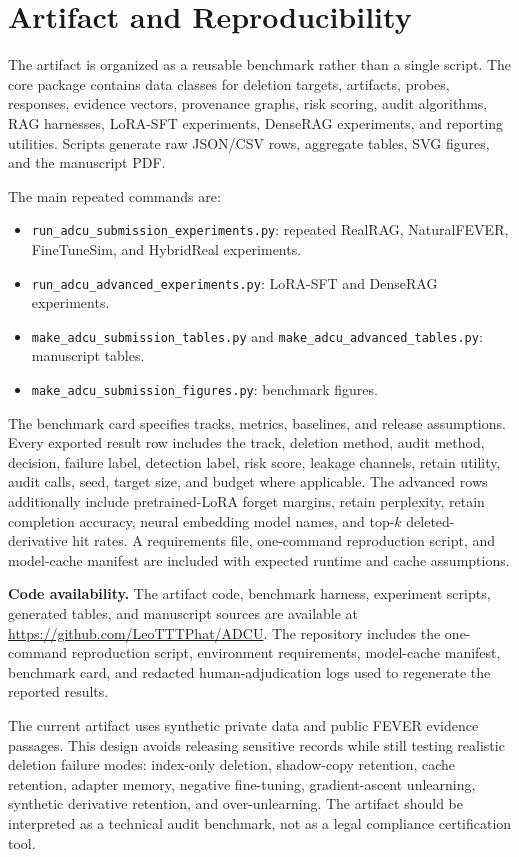 \section{Artifact and Reproducibility}

The artifact is organized as a reusable benchmark rather than a single script. The core package contains data classes for deletion targets, artifacts, probes, responses, evidence vectors, provenance graphs, risk scoring, audit algorithms, RAG harnesses, LoRA-SFT experiments, DenseRAG experiments, and reporting utilities. Scripts generate raw JSON/CSV rows, aggregate tables, SVG figures, and the manuscript PDF.

The main repeated commands are:
\begin{itemize}
\item \texttt{run\_adcu\_submission\_experiments.py}: repeated RealRAG, NaturalFEVER, FineTuneSim, and HybridReal experiments.
\item \texttt{run\_adcu\_advanced\_experiments.py}: LoRA-SFT and DenseRAG experiments.
\item \texttt{make\_adcu\_submission\_tables.py} and \texttt{make\_adcu\_advanced\_tables.py}: manuscript tables.
\item \texttt{make\_adcu\_submission\_figures.py}: benchmark figures.
\end{itemize}

The benchmark card specifies tracks, metrics, baselines, and release assumptions. Every exported result row includes the track, deletion method, audit method, decision, failure label, detection label, risk score, leakage channels, retain utility, audit calls, seed, target size, and budget where applicable. The advanced rows additionally include pretrained-LoRA forget margins, retain perplexity, retain completion accuracy, neural embedding model names, and top-$k$ deleted-derivative hit rates. A requirements file, one-command reproduction script, and model-cache manifest are included with expected runtime and cache assumptions.

\textbf{Code availability.}
The artifact code, benchmark harness, experiment scripts, generated tables, and manuscript sources are available at \url{https://github.com/LeoTTTPhat/ADCU}. The repository includes the one-command reproduction script, environment requirements, model-cache manifest, benchmark card, and redacted human-adjudication logs used to regenerate the reported results.

The current artifact uses synthetic private data and public FEVER evidence passages. This design avoids releasing sensitive records while still testing realistic deletion failure modes: index-only deletion, shadow-copy retention, cache retention, adapter memory, negative fine-tuning, gradient-ascent unlearning, synthetic derivative retention, and over-unlearning. The artifact should be interpreted as a technical audit benchmark, not as a legal compliance certification tool.
